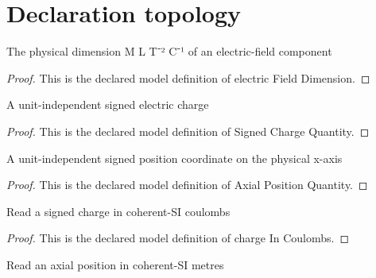 \section{Declaration topology}
\begin{definition}
  \label{def:physics:phyx-mini-0862:phyxminiproblems-problemphyxmini0862-electricfielddimension}
  The physical dimension M L T⁻² C⁻¹ of an electric-field component
\end{definition}
\begin{proof}
  This is the declared model definition of electric Field Dimension.
\end{proof}
\begin{definition}
  \label{def:physics:phyx-mini-0862:phyxminiproblems-problemphyxmini0862-signedchargequantity}
  A unit-independent signed electric charge
\end{definition}
\begin{proof}
  This is the declared model definition of Signed Charge Quantity.
\end{proof}
\begin{definition}
  \label{def:physics:phyx-mini-0862:phyxminiproblems-problemphyxmini0862-axialpositionquantity}
  A unit-independent signed position coordinate on the physical x-axis
\end{definition}
\begin{proof}
  This is the declared model definition of Axial Position Quantity.
\end{proof}
\begin{definition}
  \label{def:physics:phyx-mini-0862:phyxminiproblems-problemphyxmini0862-chargeincoulombs}
  Read a signed charge in coherent-SI coulombs
\end{definition}
\begin{proof}
  This is the declared model definition of charge In Coulombs.
\end{proof}
\begin{definition}
  \label{def:physics:phyx-mini-0862:phyxminiproblems-problemphyxmini0862-positioninmeters}
  Read an axial position in coherent-SI metres
\end{definition}
